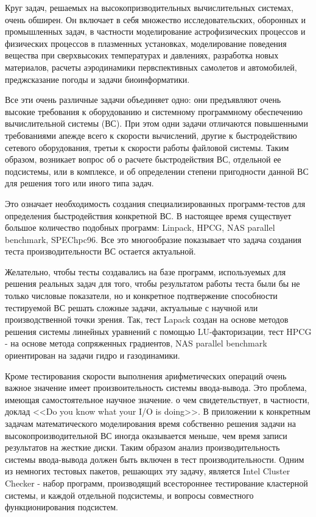 
{\actuality} Круг задач, решаемых на высокопризводительных вычислительных системах, очень обширен. Он включает в себя множество исследовательских, оборонных и промышленных задач, в частности моделирование астрофизических процессов и физических процессов в плазменных установках, моделирование поведения вещества при сверхвысоких температурах и давлениях, разработка новых материалов, расчеты аэродинамики первспективных самолетов и автомобилей, преджсказание погоды и задачи биоинформатики.

Все эти очень различные задачи объединяет одно: они предъявляют очень высокие требования к оборудованию и системному программному обеспечению вычислительной системы (ВС). При этом одни задачи  отличаются повышенными требованиями апежде всего к скорости вычислений, другие к быстродействию сетевого оборудования, третьи  к скорости работы файловой системы. Таким образом, возникает вопрос об о расчете быстродействия ВС, отдельной ее подсистемы, или в комплексе, и об определении степени пригодности данной ВС для решения того или иного типа задач. 

Это означает необходимость создания специализированных программ-тестов для определения быстродействия конкретной ВС. В настоящее время существует большое количество подобных программ: Linpack, HPCG, NAS parallel benchmark, SPEChpc96.
Все это многообразие показывает что задача создания теста производительности ВС остается актуальной.


Желательно, чтобы тесты создавались на базе программ, используемых для решения реальных задач для того, чтобы результатом работы теста были бы не только числовые показатели, но и конкретное подтвержение способности тестируемой ВС решать сложные задачи, актуальные с научной или производственной точки зрения. Так, тест Lapack создан на основе методов решения системы линейных уравнений с помощью LU-факторизации, тест HPCG - на основе метода сопряженных градиентов, NAS parallel benchmark ориентирован на задачи гидро и газодинамики.



Кроме тестирования скорости выполнения арифметических операций очень важное значение имеет произвоительность системы ввода-вывода. Это проблема, имеющая самостоятельное научное значение. о чем свидетельствует, в частности, доклад  <<Do you know what your I/O is doing>>. В приложении к конкретным задачам математического моделирования время собственно решения задачи на высокопроизводительной ВС иногда оказывается меньше, чем время записи результатов на жесткие диски.
Таким образом анализ производительность системы ввода-вывода должен быть включен в тест производительности.
Одним из немногих тестовых пакетов, решающих эту задачу, является Intel Cluster Checker - набор программ, производящий всестороннее тестирование кластерной системы, и каждой отдельной подсистемы, и вопросы совместного функционирования подсистем. 

